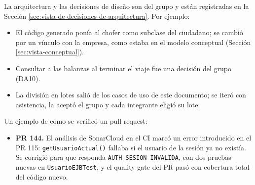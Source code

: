 La arquitectura y las decisiones de diseño son del grupo y están registradas en la Sección \ref{sec:vista-de-decisiones-de-arquitectura}. Por ejemplo:

\begin{itemize}
    \item El código generado ponía al chofer como subclase del ciudadano; se cambió por un vínculo con la empresa, como estaba en el modelo conceptual (Sección \ref{sec:vista-conceptual}).
    \item Consultar a las balanzas al terminar el viaje fue una decisión del grupo (DA10).
    \item La división en lotes salió de los casos de uso de este documento; se iteró con asistencia, la aceptó el grupo y cada integrante eligió su lote.
\end{itemize}

Un ejemplo de cómo se verificó un pull request:

\begin{itemize}
    \item \textbf{PR 144.} El análisis de SonarCloud en el CI marcó un error introducido en el PR 115: \texttt{getUsuarioActual()} fallaba si el usuario de la sesión ya no existía. Se corrigió para que responda \texttt{AUTH\_SESION\_INVALIDA}, con dos pruebas nuevas en \texttt{UsuarioEJBTest}, y el quality gate del PR pasó con cobertura total del código nuevo.
\end{itemize}

